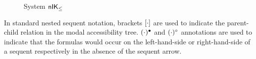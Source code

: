 \documentclass[twoside]{aiml20}
\begin{document}
\begin{figure}%
	\centering
	\small
\caption{System $\mathsf{n}\mathsf{IK}_{\le}$}
\label{fig:nIK}
\end{figure}

%
%
In standard nested sequent notation, brackets $\BR{\cdot}$ are used to indicate the parent-child relation in the modal accessibility tree.
%
$(\cdot)^\bullet$ and $(\cdot)^\circ$ annotations are used to indicate that the formulas would occur on the left-hand-side or right-hand-side of a sequent respectively in the absence of the sequent arrow.  
\end{document}
